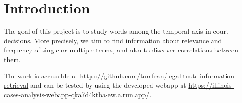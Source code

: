 \section{Introduction}

The goal of this project is to study words among the 
temporal axis in court decisions. 
More precisely, we aim to find information about relevance and 
frequency of single or multiple terms, and also to discover
correlations between them. 

The work is accessible at \url{https://github.com/tomfran/legal-texts-information-retrieval} and can be
tested by using the developed webapp at \url{https://illinois-cases-analysis-webapp-qka7d4ktba-ew.a.run.app/}.